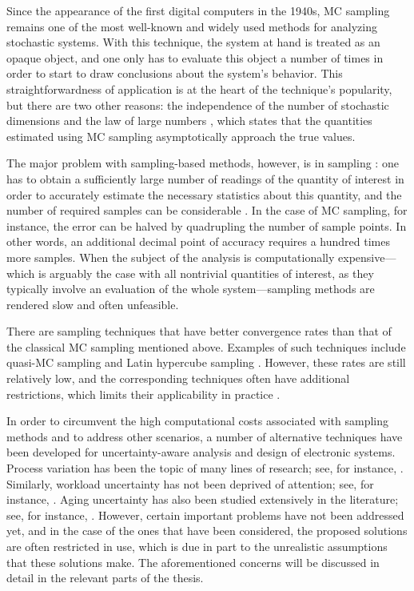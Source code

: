 Since the appearance of the first digital computers in the 1940s, \ac{MC}
sampling remains one of the most well-known and widely used methods for
analyzing stochastic systems. With this technique, the system at hand is treated
as an opaque object, and one only has to evaluate this object a number of times
in order to start to draw conclusions about the system's behavior. This
straightforwardness of application is at the heart of the technique's
popularity, but there are two other reasons: the independence of the number of
stochastic dimensions and the law of large numbers \cite{durrett2010}, which
states that the quantities estimated using \ac{MC} sampling asymptotically
approach the true values.

The major problem with sampling-based methods, however, is in sampling \perse:
one has to obtain a sufficiently large number of readings of the quantity of
interest in order to accurately estimate the necessary statistics about this
quantity, and the number of required samples can be considerable
\cite{diaz-emparanza2002}. In the case of \ac{MC} sampling, for instance, the
error can be halved by quadrupling the number of sample points. In other words,
an additional decimal point of accuracy requires a hundred times more samples.
When the subject of the analysis is computationally expensive---which is
arguably the case with all nontrivial quantities of interest, as they typically
involve an evaluation of the whole system---sampling methods are rendered slow
and often unfeasible.

There are sampling techniques that have better convergence rates than that of
the classical \ac{MC} sampling mentioned above. Examples of such techniques
include quasi-\ac{MC} sampling and Latin hypercube sampling \cite{asmussen2007}.
However, these rates are still relatively low, and the corresponding techniques
often have additional restrictions, which limits their applicability in practice
\cite{xiu2010}.

In order to circumvent the high computational costs associated with sampling
methods and to address other scenarios, a number of alternative techniques have
been developed for uncertainty-aware analysis and design of electronic systems.
Process variation has been the topic of many lines of research; see, for
instance, \cite{bhardwaj2006, vrudhula2006, bhardwaj2008, chandra2010, juan2012,
lee2013}. Similarly, workload uncertainty has not been deprived of attention;
see, for instance, \cite{diaz2002, zhu2008, schranzhofer2009, santinelli2011,
quinton2012, tanasa2015}. Aging uncertainty has also been studied extensively in
the literature; see, for instance, \cite{coskun2006, huang2009b, oboril2012,
firouzi2013, kiamehr2013, das2014c}. However, certain important problems have
not been addressed yet, and in the case of the ones that have been considered,
the proposed solutions are often restricted in use, which is due in part to the
unrealistic assumptions that these solutions make. The aforementioned concerns
will be discussed in detail in the relevant parts of the thesis.
